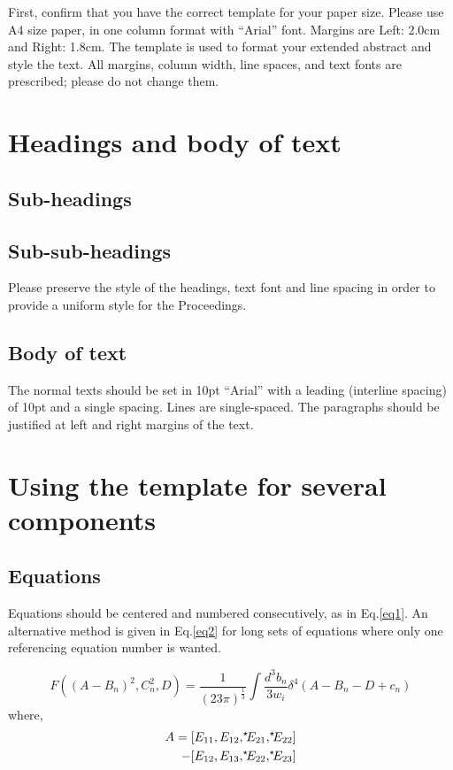 \documentclass[IAHRdraft]{IAHRYPN}
\begin{document}
First, confirm that you have the correct template for your paper size. Please use A4 size paper, in one column format with “Arial” font.  Margins are Left: 2.0cm and Right: 1.8cm. The template is used to format your extended abstract and style the text. All margins, column width, line spaces, and text fonts are prescribed; please do not change them. 


\section{Headings and body of text}

\subsection{Sub-headings}

\subsection{Sub-sub-headings}
Please preserve the style of the headings, text font and line spacing in order to provide a uniform style for the Proceedings.

\subsection{Body of text}
The normal texts should be set in 10pt “Arial” with a leading (interline spacing) of 10pt and a single spacing. Lines are single-spaced. The paragraphs should be justified at left and right margins of the text.


\section{Using the template for several components}

\subsection{Equations}
Equations should be centered and numbered consecutively, as in Eq.\ref{eq1}. An alternative method is given in Eq.\ref{eq2} for long sets of equations where only one referencing equation number is wanted.

\begin{equation}
    F((A-B_n)^2, C_n^2,D) = \frac{1}{(23\pi)^\frac{1}{3}} \int \frac{d^3 b_n}{3w_i}\delta^4 (A-B_n-D+c_n)
    \label{eq1}
\end{equation}
where,
\begin{eqnarray}
    A=[E_{11},E_{12},^\star\kern-0.8ex E_{21},^\star\kern-0.8ex E_{22}] \nonumber \\
    - [E_{12},E_{13},^\star\kern-0.8ex E_{22},^\star\kern-0.8ex E_{23}]
    \label{eq2}
\end{eqnarray}
\end{document}
